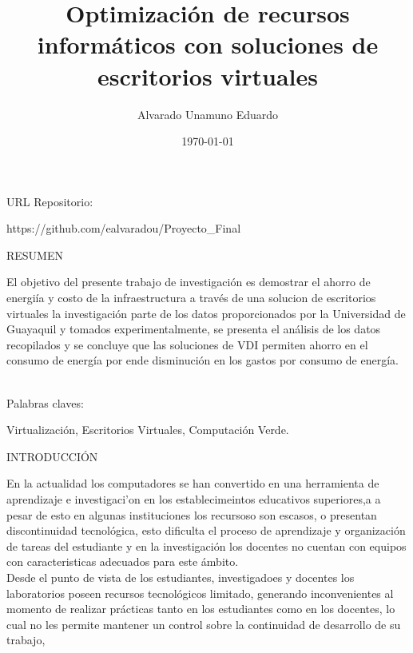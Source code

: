 \documentclass[a4paper,11pt]{article}
\begin{document}
\title{Optimizaci\'on de recursos inform\'aticos con soluciones de escritorios virtuales}
\author{Alvarado Unamuno Eduardo}
\date{\today}
\maketitle
\begin{bf}
URL Repositorio:
\end{bf}
https://github.com/ealvaradou/Proyecto\_Final
\begin{bf}
\begin{center}
RESUMEN \\
\end{center}
\end{bf}
El objetivo del presente trabajo de investigaci\'on es demostrar 
el ahorro de energi\'ia y costo de la infraestructura a trav\'es 
de una solucion de escritorios virtuales la investigaci\'on parte de los datos proporcionados 
por la Universidad de Guayaquil y tomados experimentalmente, se presenta el an\'alisis de los 
datos recopilados y se concluye que las soluciones de VDI permiten ahorro en el consumo de energ\'ia
por ende disminuci\'on en los gastos por consumo de energ\'ia.\\
\\
\begin{bf}
Palabras claves:
\end{bf}
Virtualizaci\'on, Escritorios Virtuales, Computación Verde. \\
\begin{bf}
\begin{center}
INTRODUCCI\'ON\\
\end{center}
\end{bf}
En la actualidad los computadores se han convertido en una herramienta de 
aprendizaje e investigaci'on en los establecimeintos educativos superiores,a a pesar de esto
en algunas instituciones los recursoso son escasos, o presentan discontinuidad
tecnol\'ogica, esto dificulta el proceso de aprendizaje y organizaci\'on de
tareas del estudiante y en la investigaci\'on los docentes no cuentan con
equipos con caracteristicas adecuados para este \'ambito.\\
Desde el punto de vista de los estudiantes, investigadoes y docentes los laboratorios
poseen recursos tecnol\'ogicos limitado, generando inconvenientes al momento
de realizar pr\'acticas tanto en los estudiantes como en los docentes,
lo cual no les permite mantener un control sobre la continuidad de desarrollo de su trabajo,
\end{document}
